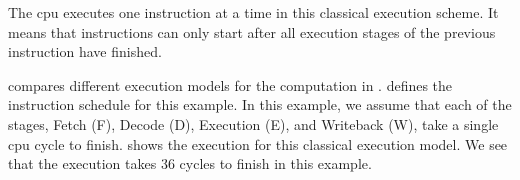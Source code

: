 The \ac{cpu} executes one instruction at a time in this classical execution scheme.
It means that instructions can only start after all execution stages of the previous instruction have finished.

 compares different execution models for the computation in .
 defines the instruction schedule for this example.
In this example, we assume that each of the stages, Fetch (F), Decode (D), Execution (E), and Writeback (W), take a single \ac{cpu} cycle to finish.
 shows the execution for this classical execution model.
We see that the execution takes 36 cycles to finish in this example.

